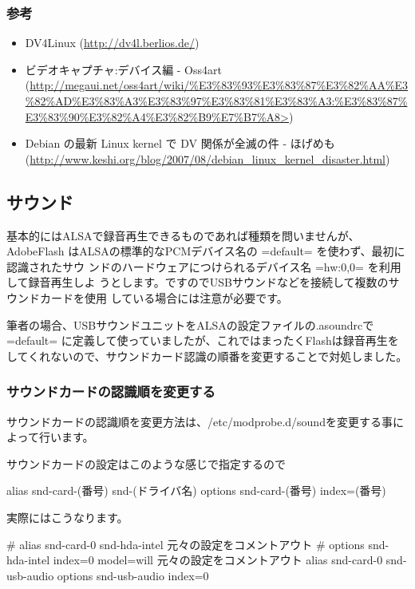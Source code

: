 \documentclass[mingoth,a4paper]{jsarticle}
\begin{document}
\subsubsection{参考}

\begin{itemize}
 \item DV4Linux (\url{http://dv4l.berlios.de/})
 \item ビデオキャプチャ:デバイス編 - Oss4art
 (\url{http://megaui.net/oss4art/wiki/%E3%83%93%E3%83%87%E3%82%AA%E3%82%AD%E3%83%A3%E3%83%97%E3%83%81%E3%83%A3:%E3%83%87%E3%83%90%E3%82%A4%E3%82%B9%E7%B7%A8>})
 \item Debian の最新 Linux kernel で DV 関係が全滅の件 - ほげめも
       (\url{http://www.keshi.org/blog/2007/08/debian_linux_kernel_disaster.html})
\end{itemize}

\subsection{サウンド}
基本的にはALSAで録音再生できるものであれば種類を問いませんが、AdobeFlash
はALSAの標準的なPCMデバイス名の =default= を使わず、最初に認識されたサウ
ンドのハードウェアにつけられるデバイス名 =hw:0,0= を利用して録音再生しよ
うとします。ですのでUSBサウンドなどを接続して複数のサウンドカードを使用
している場合には注意が必要です。

筆者の場合、USBサウンドユニットをALSAの設定ファイルの.asoundrcで
=default= に定義して使っていましたが、これではまったくFlashは録音再生を
してくれないので、サウンドカード認識の順番を変更することで対処しました。

\subsubsection{サウンドカードの認識順を変更する}

サウンドカードの認識順を変更方法は、/etc/modprobe.d/soundを変更する事に
よって行います。

サウンドカードの設定はこのような感じで指定するので

\begin{commandline}
alias snd-card-(番号) snd-(ドライバ名)
options snd-card-(番号) index=(番号)
\end{commandline}

実際にはこうなります。

\begin{commandline}
# alias snd-card-0 snd-hda-intel           元々の設定をコメントアウト
# options snd-hda-intel index=0 model=will 元々の設定をコメントアウト
alias snd-card-0 snd-usb-audio
options snd-usb-audio index=0
\end{commandline}
\end{document}
